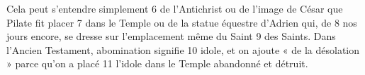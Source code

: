 Cela peut s'entendre simplement	 
6	 	de l'Antichrist ou de l'image de César que Pilate fit placer	 
7	 	dans le Temple ou de la statue équestre d'Adrien qui, de	 
8	 	nos jours encore, se dresse sur l'emplacement même du Saint	 
9	 	des Saints. Dans l'Ancien Testament, abomination signifie	 
10	 	idole, et on ajoute « de la désolation » parce qu'on a placé	 
11	 	l'idole dans le Temple abandonné et détruit.